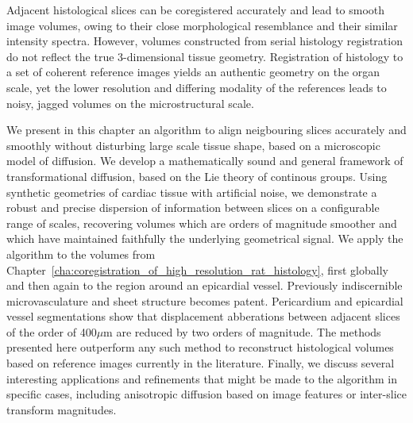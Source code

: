 Adjacent histological slices can be coregistered accurately and lead to smooth image volumes, owing to their close morphological resemblance and their similar intensity spectra. However, volumes constructed from serial histology registration do not reflect the true 3-dimensional tissue geometry. Registration of histology to a set of coherent reference images yields an authentic geometry on the organ scale, yet the lower resolution and differing modality of the references leads to noisy, jagged volumes on the microstructural scale.

We present in this chapter an algorithm to align neigbouring slices accurately and smoothly without disturbing large scale tissue shape, based on a microscopic model of diffusion. We develop a mathematically sound and general framework of transformational diffusion, based on the Lie theory of continous groups. Using synthetic geometries of cardiac tissue with artificial noise, we demonstrate a robust and precise dispersion of information between slices on a configurable range of scales, recovering volumes which are orders of magnitude smoother and which have maintained faithfully the underlying geometrical signal. We apply the algorithm to the volumes from Chapter~\ref{cha:coregistration_of_high_resolution_rat_histology}, first globally and then again to the region around an epicardial vessel. Previously indiscernible microvasculature and sheet structure becomes patent. Pericardium and epicardial vessel segmentations show that displacement abberations between adjacent slices of the order of 400$\mu$m are reduced by two orders of magnitude. The methods presented here outperform any such method to reconstruct histological volumes based on reference images currently in the literature. Finally, we discuss several interesting applications and refinements that might be made to the algorithm in specific cases, including anisotropic diffusion based on image features or inter-slice transform magnitudes.

